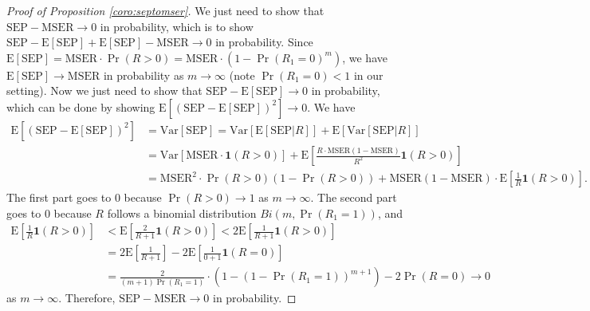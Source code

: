 \documentclass[11pt]{article}
\newcommand{\Exp}[1]{{\text{E}}[ \ensuremath{ #1 } ]  }
\newcommand{\Var}[1]{{\text{Var}}[ \ensuremath{ #1 } ]  }
\begin{document}
\begin{proof}[Proof of  Proposition \ref{coro:septomser}]
We just need to show that $\text{SEP} - \text{MSER} \to 0$ in probability, which is to show $\text{SEP}  -\Exp{\text{SEP}} +\Exp{\text{SEP}} - \text{MSER} \to 0 $ in probability. Since $\Exp{\text{SEP}} = \text{MSER} \cdot \Pr(R>0) = \text{MSER} \cdot (1-\Pr(R_1=0)^m)$, we have $\Exp{\text{SEP}} \to \text{MSER}$ in probability as $m \to \infty$ (note $\Pr(R_1=0)<1$ in our setting). Now we just need to show that $\text{SEP} - \Exp{\text{SEP}} \to 0$ in probability, which can be done by showing $\Exp{(\text{SEP} - \Exp{\text{SEP}})^2} \to 0$. We have
\begin{equation*}
\begin{split}
\Exp{(\text{SEP} - \Exp{\text{SEP}})^2} & = \Var{\text{SEP}}  =  \Var{\Exp{\text{SEP}|R}} + \Exp{\Var{\text{SEP}|R}} \\
& = \Var{\text{MSER} \cdot \textbf{1}(R>0)} +  \Exp{\frac{R\cdot \text{MSER}(1-\text{MSER})}{R^2} \textbf{1}(R>0)} \\
& = \text{MSER}^2\cdot \Pr(R>0)(1- \Pr(R>0)) +  \text{MSER}(1-\text{MSER}) \cdot \Exp{\frac{1}{R}\textbf{1}(R>0)}.
\end{split}
\end{equation*}
The first part goes to 0 because $\Pr(R>0) \to 1$ as $m \to \infty$. The second part goes to 0 because $R$ follows a binomial distribution $Bi(m, \Pr(R_1=1))$, and 
\begin{equation*}
\begin{split}
\Exp{\frac{1}{R}\textbf{1}(R>0)} & < \Exp{\frac{2}{R+1}\textbf{1}(R>0)} < 2  \Exp{\frac{1}{R+1}\textbf{1}(R>0)} \\ &= 2  \Exp{\frac{1}{R+1}} - 2 \Exp{\frac{1}{0+1}\textbf{1}(R=0) }  \\ &= \frac{2}{(m+1)\Pr(R_1 = 1)}\cdot (1-(1-\Pr(R_1=1))^{m+1}) - 2\Pr(R=0) \to 0 
\end{split}
\end{equation*}
as $m \to \infty$. Therefore, $\text{SEP} - \text{MSER} \to 0$ in probability. 
\end{proof}


\end{document}
